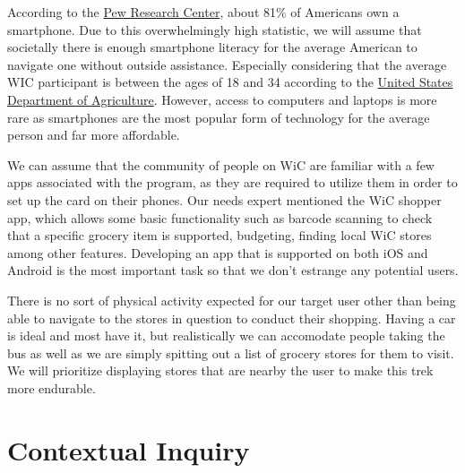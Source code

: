 \documentclass{article}
\begin{document}
According to the \href{https://www.pewresearch.org/internet/fact-sheet/mobile/}{Pew Research Center}, about 81\% of Americans own a smartphone. Due to this overwhelmingly high statistic, we will assume that societally there is enough smartphone literacy for the average American to navigate one without outside assistance. Especially considering that the average WIC participant is between the ages of 18 and 34 according to the \href{https://fns-prod.azureedge.net/sites/default/files/PC98_Summary.pdf}{United States Department of Agriculture}. However, access to computers and laptops is more rare as smartphones are the most popular form of technology for the average person and far more affordable. \par

We can assume that the community of people on WiC are familiar with a few apps associated with the program, as they are required to utilize them in order to set up the card on their phones. Our needs expert mentioned the WiC shopper app, which allows some basic functionality such as barcode scanning to check that a specific grocery item is supported, budgeting, finding local WiC stores among other features. Developing an app that is supported on both iOS and Android is the most important task so that we don’t estrange any potential users. \par

There is no sort of physical activity expected for our target user other than being able to navigate to the stores in question to conduct their shopping. Having a car is ideal and most have it, but realistically we can accomodate people taking the bus as well as we are simply spitting out a list of grocery stores for them to visit. We will prioritize displaying stores that are nearby the user to make this trek more endurable. 

\section{Contextual Inquiry}
\end{document}
